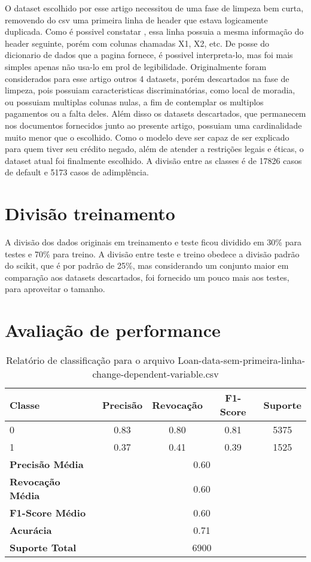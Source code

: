 \documentclass[12pt]{article}
\begin{document}
O dataset escolhido por esse artigo\cite{dataset} necessitou de uma fase de limpeza bem curta, removendo do csv uma primeira linha de header que estava logicamente duplicada. Como é possivel constatar \cite{kaggle}, essa linha possuia a mesma informação do header seguinte, porém com colunas chamadas X1, X2, etc. De posse do dicionario de dados que a pagina fornece, é possivel interpreta-lo, mas foi mais simples apenas não usa-lo em prol de legibilidade. Originalmente foram considerados para esse artigo outros 4 datasets, porém descartados na fase de limpeza, pois possuiam caracteristicas discriminatórias, como local de moradia, ou possuiam multiplas colunas nulas, a fim de contemplar os multiplos pagamentos ou a falta deles. Além disso os datasets descartados, que permanecem nos documentos fornecidos junto ao presente artigo, possuiam uma cardinalidade muito menor que o escolhido. Como o modelo deve ser capaz de ser explicado para quem tiver seu crédito negado, além de atender a restrições legais e éticas, o dataset atual foi finalmente escolhido. A divisão entre as classes é de 17826 casos de default e 5173 casos de adimplência.

\section{Divisão treinamento}

A divisão dos dados originais em treinamento e teste ficou dividido em 30\% para testes e 70\% para treino. A divisão entre teste e treino obedece a divisão padrão do scikit, que é por padrão de 25\%, mas considerando um conjunto maior em comparação aos datasets descartados, foi fornecido um pouco mais aos testes, para aproveitar o tamanho.

\section{Avaliação de performance}
\begin{table}[h]
	\centering
	\begin{tabular}{lcccc}
		\hline
		\textbf{Classe} & \textbf{Precisão} & \textbf{Revocação} & \textbf{F1-Score} & \textbf{Suporte} \\ \hline
		0                & 0.83              & 0.80               & 0.81               & 5375              \\
		1                & 0.37              & 0.41               & 0.39               & 1525              \\ \hline
		\textbf{Precisão Média} & \multicolumn{4}{c}{0.60} \\
		\textbf{Revocação Média} & \multicolumn{4}{c}{0.60} \\
		\textbf{F1-Score Médio} & \multicolumn{4}{c}{0.60} \\
		\textbf{Acurácia} & \multicolumn{4}{c}{0.71} \\
		\textbf{Suporte Total} & \multicolumn{4}{c}{6900} \\ \hline
	\end{tabular}
	\caption{Relatório de classificação para o arquivo Loan-data-sem-primeira-linha-change-dependent-variable.csv}
	\label{tab:class_report}
\end{table}
\end{document}
